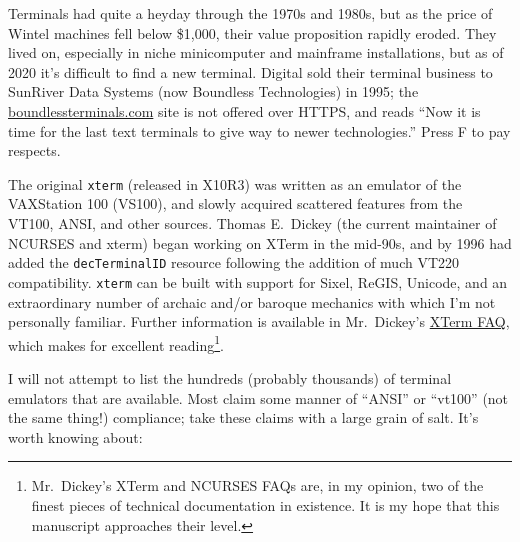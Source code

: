 Terminals had quite a heyday through the 1970s and 1980s, but as the price of
Wintel machines fell below \$1,000, their value proposition rapidly eroded.
They lived on, especially in niche minicomputer and mainframe installations,
but as of 2020 it's difficult to find a new terminal. Digital sold their
terminal business to SunRiver Data Systems (now Boundless Technologies) in
1995; the \url{boundlessterminals.com} site is not offered over HTTPS, and
reads ``Now it is time for the last text terminals to give way to newer
technologies\cite{boundless}.'' Press F to pay respects.

The original \texttt{xterm} (released in X10R3) was written as an emulator of
the VAXStation 100 (VS100), and slowly acquired scattered features from the
VT100, ANSI, and other sources\cite{xtermfaq}. Thomas E.\ Dickey (the current
maintainer of \Gls{NCURSES} and xterm) began working on XTerm in the mid-90s,
and by 1996 had added the \texttt{decTerminalID} resource following the
addition of much VT220 compatibility. \texttt{xterm} can be built with support
for Sixel, ReGIS, Unicode, and an extraordinary number of archaic and/or
baroque mechanics with which I'm not personally familiar. Further information
is available in Mr.\ Dickey's
\href{https://invisible-island.net/xterm/xterm.faq.html}{XTerm FAQ}, which
makes for excellent reading\footnote{Mr.\ Dickey's XTerm and NCURSES FAQs are,
in my opinion, two of the finest pieces of technical documentation in
existence. It is my hope that this manuscript approaches their level.}.

I will not attempt to list the hundreds (probably thousands) of terminal
emulators that are available. Most claim some manner of ``ANSI'' or ``vt100''
(not the same thing!) compliance; take these claims with a large grain of salt.
It's worth knowing about:

